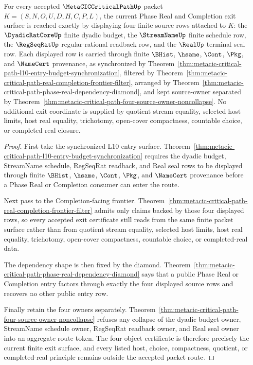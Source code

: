 \begin{theorem}
\label{thm:metacic-critical-path-l10-four-object-exit-certificate}
For every accepted $\MetaCICCriticalPathUp$ packet $K=(S,N,O,U,D,H,C,P,L)$, the current Phase Real and Completion exit surface is reached exactly by displaying four finite source rows attached to $K$: the $\DyadicRatCoreUp$ finite dyadic budget, the $\StreamNameUp$ finite schedule row, the $\RegSeqRatUp$ regular-rational readback row, and the $\RealUp$ terminal seal row. Each displayed row is carried through finite $\BHist$, $\hsame$, $\Cont$, $\Pkg$, and $\NameCert$ provenance, as synchronized by Theorem~\ref{thm:metacic-critical-path-l10-entry-budget-synchronization}, filtered by Theorem~\ref{thm:metacic-critical-path-real-completion-frontier-filter}, arranged by Theorem~\ref{thm:metacic-critical-path-phase-real-dependency-diamond}, and kept source-owner separated by Theorem~\ref{thm:metacic-critical-path-four-source-owner-noncollapse}. No additional exit coordinate is supplied by quotient stream equality, selected host limits, host real equality, trichotomy, open-cover compactness, countable choice, or completed-real closure.
\end{theorem}
\begin{proof}
First take the synchronized L10 entry surface. Theorem~\ref{thm:metacic-critical-path-l10-entry-budget-synchronization} requires the dyadic budget, StreamName schedule, RegSeqRat readback, and Real seal rows to be displayed through finite $\BHist$, $\hsame$, $\Cont$, $\Pkg$, and $\NameCert$ provenance before a Phase Real or Completion consumer can enter the route.

Next pass to the Completion-facing frontier. Theorem~\ref{thm:metacic-critical-path-real-completion-frontier-filter} admits only claims backed by those four displayed rows, so every accepted exit certificate still reads from the same finite packet surface rather than from quotient stream equality, selected host limits, host real equality, trichotomy, open-cover compactness, countable choice, or completed-real data.

The dependency shape is then fixed by the diamond. Theorem~\ref{thm:metacic-critical-path-phase-real-dependency-diamond} says that a public Phase Real or Completion entry factors through exactly the four displayed source rows and recovers no other public entry row.

Finally retain the four owners separately. Theorem~\ref{thm:metacic-critical-path-four-source-owner-noncollapse} refuses any collapse of the dyadic budget owner, StreamName schedule owner, RegSeqRat readback owner, and Real seal owner into an aggregate route token. The four-object certificate is therefore precisely the current finite exit surface, and every listed host, choice, compactness, quotient, or completed-real principle remains outside the accepted packet route.
\end{proof}


